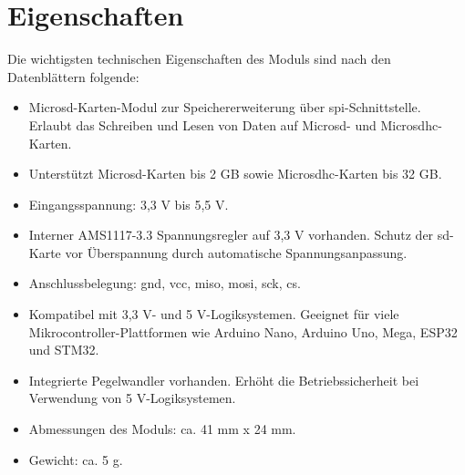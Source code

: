 
\section{Eigenschaften}

Die wichtigsten technischen Eigenschaften des Moduls sind nach den Datenblättern \cite{roboter-bausatzde_micro_2025} \cite{az-delivery_vertriebs_gmbh_sd-karten-modul_2015} folgende:

\begin{itemize}
    \item Micro\acs{sd}-Karten-Modul zur Speichererweiterung über \ac{spi}-Schnittstelle. 
    Erlaubt das Schreiben und Lesen von Daten auf Micro\ac{sd}- und Micro\ac{sdhc}-Karten.
    \item Unterstützt Micro\ac{sd}-Karten bis 2 GB sowie Micro\ac{sdhc}-Karten bis 32 GB. 
    \item Eingangsspannung: 3,3 V bis 5,5 V.
    \item Interner AMS1117-3.3 Spannungsregler auf 3,3 V vorhanden.
    Schutz der \ac{sd}-Karte vor Überspannung durch automatische Spannungsanpassung.
    \item Anschlussbelegung: \acs{gnd}, \acs{vcc}, \acs{miso}, \acs{mosi}, \acs{sck}, \acs{cs}. 
    \item Kompatibel mit 3,3 V- und 5 V-Logiksystemen. 
    Geeignet für viele Mikrocontroller-Plattformen wie Arduino Nano, Arduino Uno, Mega, ESP32 und STM32.
    \item Integrierte Pegelwandler vorhanden. 
    Erhöht die Betriebssicherheit bei Verwendung von 5 V-Logiksystemen.
    \item Abmessungen des Moduls: ca. 41 mm x 24 mm.
    \item Gewicht: ca. 5 g.
\end{itemize}

\medskip

